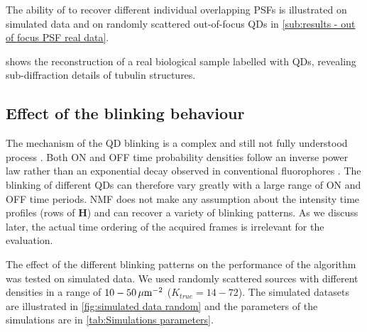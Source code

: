 The ability of \inmf{} to recover different individual overlapping PSFs is illustrated on simulated data and on randomly scattered out-of-focus QDs in \autoref{sub:results - out of focus PSF real data}.

 shows the \inmf{} reconstruction of a real biological sample labelled with QDs, revealing sub-diffraction details of tubulin structures.


\subsection{Effect of the blinking behaviour \label{sub:results - blinking behaviour}}
The mechanism of the QD blinking is a complex and still not fully understood process \cite{Stefani2009}. Both ON and OFF time probability densities follow an inverse power law rather than an exponential decay observed in conventional fluorophores \cite{Kuno2001}. The blinking of different QDs can therefore vary greatly with a large range of ON and OFF time periods. NMF does not make any assumption about the intensity time profiles (rows of $\bm{H}$) and can recover a variety of blinking patterns. As we discuss later, the actual time ordering of the acquired frames is irrelevant for the \inmf{} evaluation. 

The effect of the different blinking patterns on the performance of the \inmf{} algorithm was tested on simulated data. We used randomly scattered sources with different densities in a range of $10-50\, \mathrm{\mu m}^{-2}$ ($K_{true}=14-72$). The simulated datasets are illustrated in \autoref{fig:simulated data random} and the parameters of the simulations are in \autoref{tab:Simulations parameters}. 

